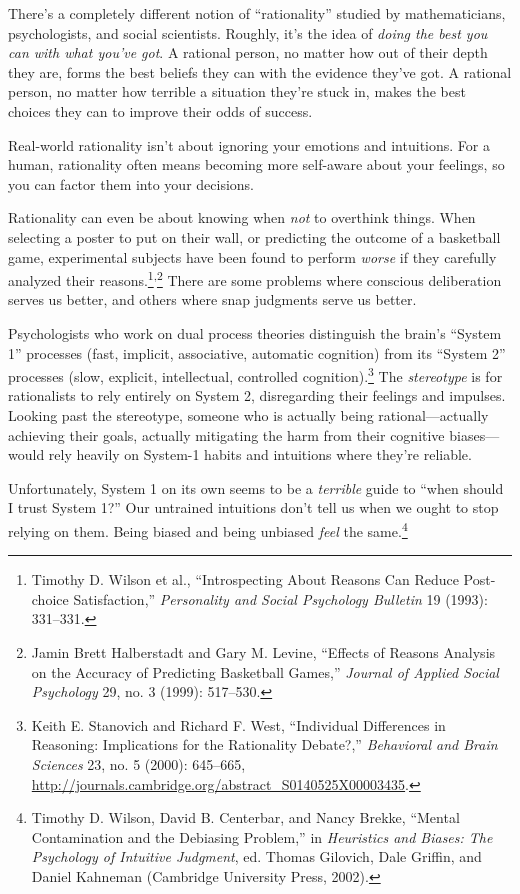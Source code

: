 \documentclass[letterpaper]{book}
\newcommand{\supercomma}{\textsuperscript{,}}
\newcommand{\comment}[1]{
}
\begin{document}
{
 There's a completely different notion of
``rationality'' studied by
mathematicians, psychologists, and social scientists. Roughly,
it's the idea of \textit{doing the best you can with
what you've got}. A rational person, no matter how out
of their depth they are, forms the best beliefs they can with the
evidence they've got. A rational person, no matter how
terrible a situation they're stuck in, makes the best
choices they can to improve their odds of success.}

{
 Real-world rationality isn't about ignoring your
emotions and intuitions. For a human, rationality often means becoming
more self-aware about your feelings, so you can factor them into your
decisions.}

{
 Rationality can even be about knowing when \textit{not} to
overthink things. When selecting a poster to put on their wall, or
predicting the outcome of a basketball game, experimental subjects have
been found to perform \textit{worse} if they carefully analyzed their
reasons.\footnote{Timothy D. Wilson et al., ``Introspecting
About Reasons Can Reduce Post-choice Satisfaction,''
\textit{Personality and Social Psychology Bulletin} 19 (1993):
331--331.\comment{3}}\supercomma\footnote{Jamin Brett Halberstadt and Gary M. Levine,
``Effects of Reasons Analysis on the Accuracy of
Predicting Basketball Games,'' \textit{Journal of
Applied Social Psychology} 29, no. 3 (1999): 517--530.\comment{4}} There are some problems where conscious
deliberation serves us better, and others where snap judgments serve us
better.}

{
 Psychologists who work on dual process theories distinguish the
brain's ``System 1''
processes (fast, implicit, associative, automatic cognition) from its
``System 2'' processes (slow,
explicit, intellectual, controlled cognition).\footnote{Keith E. Stanovich and Richard F. West,
``Individual Differences in Reasoning: Implications
for the Rationality Debate?,'' \textit{Behavioral and
Brain Sciences} 23, no. 5 (2000): 645--665,
\url{http://journals.cambridge.org/abstract_S0140525X00003435}.\comment{5}} The
\textit{stereotype} is for rationalists to rely entirely on System 2,
disregarding their feelings and impulses. Looking past the stereotype,
someone who is actually being rational---actually achieving their
goals, actually mitigating the harm from their cognitive biases---would
rely heavily on System-1 habits and intuitions where
they're reliable.}

{
 Unfortunately, System 1 on its own seems to be a \textit{terrible}
guide to ``when should I trust System
1?'' Our untrained intuitions don't
tell us when we ought to stop relying on them. Being biased and being
unbiased \textit{feel} the same.\footnote{Timothy D. Wilson, David B. Centerbar, and Nancy Brekke,
``Mental Contamination and the Debiasing
Problem,'' in \textit{Heuristics and Biases: The
Psychology of Intuitive Judgment}, ed. Thomas Gilovich, Dale Griffin,
and Daniel Kahneman (Cambridge University Press, 2002).\comment{6}}}
\end{document}
